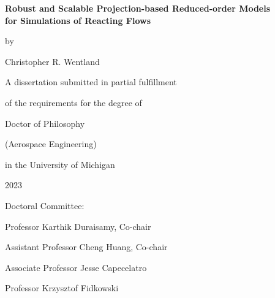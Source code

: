 \thispagestyle{empty}

\begin{singlespace}
\begin{center}

	\textbf{Robust and Scalable Projection-based Reduced-order Models \\for Simulations of Reacting Flows}

	\vspace{2em}

	by

	\vspace{2em}

    Christopher R. Wentland

	\vspace{6em}

	A dissertation submitted in partial fulfillment

	of the requirements for the degree of

	Doctor of Philosophy

	(Aerospace Engineering)

	in the University of Michigan

	2023

\end{center}

\vspace{8em}

Doctoral Committee:

\vspace{1em}

\hspace{3em}Professor Karthik Duraisamy, Co-chair

\hspace{3em}Assistant Professor Cheng Huang, Co-chair

\hspace{3em}Associate Professor Jesse Capecelatro

\hspace{3em}Professor Krzysztof Fidkowski

\end{singlespace}
\restoregeometry